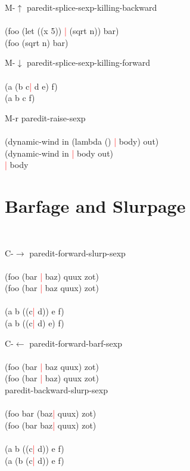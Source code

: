 \documentclass[8pt,a4paper,landscape]{extarticle}
\newcommand{\csr}{\textcolor{red}{| }}
\begin{document}
\begin{multicols}{4}
\begin{eqlist}
\item[M-$\uparrow$] paredit-splice-sexp-killing-backward\\
  \\
  (foo (let ((x 5)) \csr (sqrt n)) bar)\\
  (foo (sqrt n) bar)\\


\item[M-$\downarrow$] paredit-splice-sexp-killing-forward\\
  \\
  (a (b c\csr  d e) f)\\
  (a b c f)\\


\item[M-r] paredit-raise-sexp\\
  \\
  (dynamic-wind in (lambda () \csr body) out)\\
  (dynamic-wind in \csr body out)\\
  \csr body\\
\end{eqlist}

\section{Barfage and Slurpage}
\begin{eqlist}
  \tt
\item[C-$\rightarrow$] paredit-forward-slurp-sexp\\
  \\
  (foo (bar \csr baz) quux zot)\\
  (foo (bar \csr baz quux) zot)\\
  \\
  (a b ((c\csr  d)) e f)\\
  (a b ((c\csr  d) e) f)\\


\item[C-$\leftarrow$] paredit-forward-barf-sexp\\
  \\
  (foo (bar \csr baz quux) zot)\\
  (foo (bar \csr baz) quux zot)\\


\longitem[C-M-$\leftarrow$] paredit-backward-slurp-sexp\\
  \\
  (foo bar (baz\csr  quux) zot)\\
  (foo (bar baz\csr  quux) zot)\\
  \\
  (a b ((c\csr  d)) e f)\\
  (a (b (c\csr  d)) e f)\\



\end{eqlist}
\end{multicols}
\end{document}
